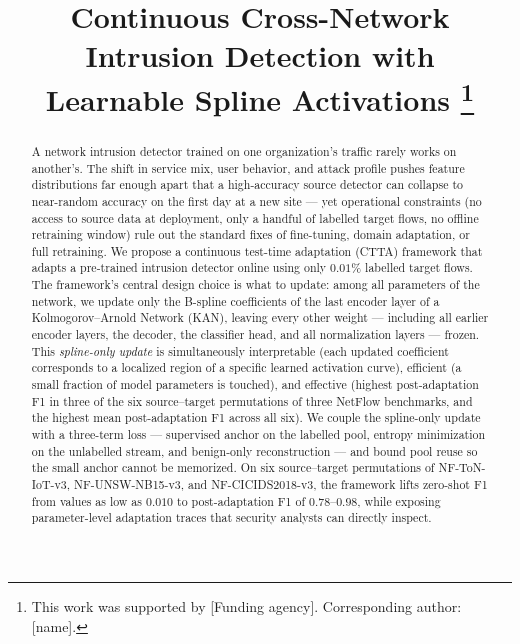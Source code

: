 \documentclass[10pt, conference, letterpaper]{IEEEtran}
\begin{document}
\title{Continuous Cross-Network Intrusion Detection with\\
Learnable Spline Activations
\thanks{This work was supported by [Funding agency]. Corresponding author: [name].}
}

\author{
}

\maketitle

\begin{abstract}
A network intrusion detector trained on one organization's traffic rarely works on another's. The shift in service mix, user behavior, and attack profile pushes feature distributions far enough apart that a high-accuracy source detector can collapse to near-random accuracy on the first day at a new site --- yet operational constraints (no access to source data at deployment, only a handful of labelled target flows, no offline retraining window) rule out the standard fixes of fine-tuning, domain adaptation, or full retraining. We propose a continuous test-time adaptation (CTTA) framework that adapts a pre-trained intrusion detector online using only $0.01\%$ labelled target flows. The framework's central design choice is what to update: among all parameters of the network, we update only the B-spline coefficients of the last encoder layer of a Kolmogorov--Arnold Network (KAN), leaving every other weight --- including all earlier encoder layers, the decoder, the classifier head, and all normalization layers --- frozen. This \emph{spline-only update} is simultaneously interpretable (each updated coefficient corresponds to a localized region of a specific learned activation curve), efficient (a small fraction of model parameters is touched), and effective (highest post-adaptation F1 in three of the six source--target permutations of three NetFlow benchmarks, and the highest mean post-adaptation F1 across all six). We couple the spline-only update with a three-term loss --- supervised anchor on the labelled pool, entropy minimization on the unlabelled stream, and benign-only reconstruction --- and bound pool reuse so the small anchor cannot be memorized. On six source--target permutations of NF-ToN-IoT-v3, NF-UNSW-NB15-v3, and NF-CICIDS2018-v3, the framework lifts zero-shot F1 from values as low as $0.010$ to post-adaptation F1 of $0.78$--$0.98$, while exposing parameter-level adaptation traces that security analysts can directly inspect.
\end{abstract}
\end{document}
